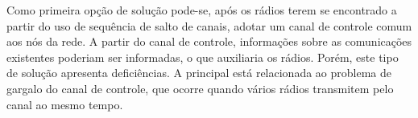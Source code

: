 
Como primeira opção de solução pode-se, após os rádios terem se encontrado a partir do uso de sequência de salto de canais, adotar um canal de controle comum aos nós da rede. A partir do canal de controle, informações sobre as comunicações existentes poderiam ser informadas, o que auxiliaria os rádios. Porém, este tipo de solução apresenta deficiências. A principal está relacionada ao problema de gargalo do canal de controle, que ocorre quando vários rádios transmitem pelo canal ao mesmo tempo.








